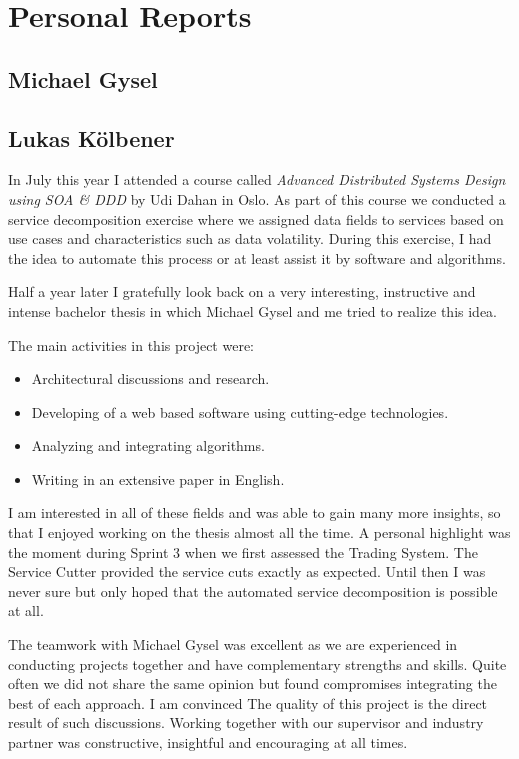 \chapter{Personal Reports}

\section{Michael Gysel}


\section{Lukas Kölbener}

In July this year I attended a course called \textit{Advanced Distributed Systems Design using SOA \& DDD} by Udi Dahan in Oslo. As part of this course we conducted a service decomposition exercise where we assigned data fields to services based on use cases and characteristics such as data volatility. During this exercise, I had the idea to automate this process or at least assist it by software and algorithms. 

Half a year later I gratefully look back on a very interesting, instructive and intense bachelor thesis in which Michael Gysel and me tried to realize this idea. 

The main activities in this project were:

\begin{itemize}
	\item Architectural discussions and research.
	\item Developing of a web based software using cutting-edge technologies.
	\item Analyzing and integrating algorithms.
	\item Writing in an extensive paper in English.
\end{itemize}

I am interested in all of these fields and was able to gain many more insights, so that I enjoyed working on the thesis almost all the time. A personal highlight was the moment during Sprint 3 when we first assessed the Trading System. The Service Cutter provided the service cuts exactly as expected. Until then I was never sure but only hoped that the automated service decomposition is possible at all. 

The teamwork with Michael Gysel was excellent as we are experienced in conducting projects together and have complementary strengths and skills. Quite often we did not share the same opinion but found compromises integrating the best of each approach. I am convinced The quality of this project is the direct result of such discussions. Working together with our supervisor and industry partner was constructive, insightful and encouraging at all times. 

